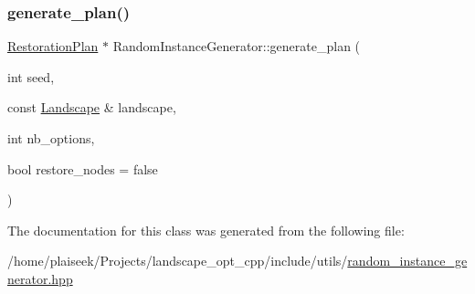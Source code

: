 \subsubsection{\texorpdfstring{generate\+\_\+plan()}{generate\_plan()}}
{\footnotesize\ttfamily \hyperlink{class_restoration_plan}{Restoration\+Plan} $\ast$ Random\+Instance\+Generator\+::generate\+\_\+plan (\begin{DoxyParamCaption}\item[{int}]{seed,  }\item[{const \hyperlink{class_landscape}{Landscape} \&}]{landscape,  }\item[{int}]{nb\+\_\+options,  }\item[{bool}]{restore\+\_\+nodes = {\ttfamily false} }\end{DoxyParamCaption})}



The documentation for this class was generated from the following file\+:\begin{DoxyCompactItemize}
\item 
/home/plaiseek/\+Projects/landscape\+\_\+opt\+\_\+cpp/include/utils/\hyperlink{random__instance__generator_8hpp}{random\+\_\+instance\+\_\+generator.\+hpp}\end{DoxyCompactItemize}

